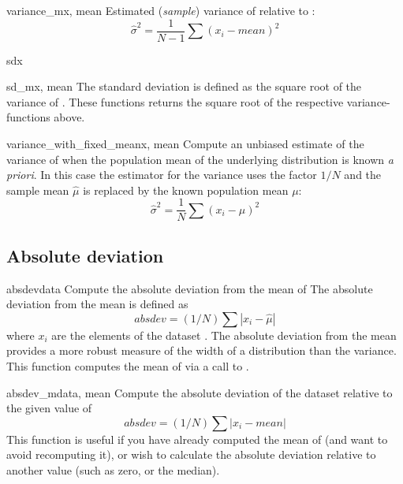 \begin{funcdesc}{variance_m}{x, mean}
   Estimated (\emph{sample}) variance of  relative to :
   \begin{equation}
      \hat\sigma^2 = \frac{1}{N-1} \sum (x_i - mean)^2
   \end{equation}
\end{funcdesc}

\begin{funcdesc}{sd}{x}
\end{funcdesc}
\begin{funcdesc}{sd_m}{x, mean}
   The standard deviation is defined as the square root of the variance of
   .  These functions returns the square root of the respective
   variance-functions above.
\end{funcdesc}

\begin{funcdesc}{variance_with_fixed_mean}{x, mean}
   Compute an unbiased estimate of the variance of  when the population
   mean  of the underlying distribution is known \emph{a priori}.  In
   this case the estimator for the variance uses the factor $1/N$ and the
   sample mean $\hat\mu$ is replaced by the known population mean $\mu$:
   \begin{equation}
      \hat\sigma^2 = \frac{1}{N} \sum (x_i - \mu)^2
   \end{equation}
\end{funcdesc}


\subsection{Absolute deviation}
\label{sec:stat:absolute-deviation}

\begin{funcdesc}{absdev}{data}
   Compute the absolute deviation from the mean of  The absolute
   deviation from the mean is defined as
   \begin{equation}
      absdev  = (1/N) \sum |x_i - \hat\mu|
   \end{equation}
   where $x_i$ are the elements of the dataset .  The absolute
   deviation from the mean provides a more robust measure of the width of a
   distribution than the variance.  This function computes the mean of
    via a call to .
\end{funcdesc}

\begin{funcdesc}{absdev_m}{data, mean}
   Compute the absolute deviation of the dataset  relative to the
   given value of 
   \begin{equation}
      absdev  = (1/N) \sum |x_i - mean|
   \end{equation}
   This function is useful if you have already computed the mean of 
   (and want to avoid recomputing it), or wish to calculate the absolute
   deviation relative to another value (such as zero, or the median).
\end{funcdesc}


